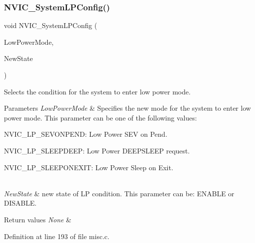 \mbox{\label{group___m_i_s_c_gae21011c5232f5b8f366acbecd12a1d4a}} 
\subsubsection{\texorpdfstring{N\+V\+I\+C\+\_\+\+System\+L\+P\+Config()}{NVIC\_SystemLPConfig()}}
{\footnotesize\ttfamily void N\+V\+I\+C\+\_\+\+System\+L\+P\+Config (\begin{DoxyParamCaption}\item[{uint8\+\_\+t}]{Low\+Power\+Mode,  }\item[{Functional\+State}]{New\+State }\end{DoxyParamCaption})}



Selects the condition for the system to enter low power mode. 


\begin{DoxyParams}{Parameters}
{\em Low\+Power\+Mode} & Specifies the new mode for the system to enter low power mode. This parameter can be one of the following values\+: \begin{DoxyItemize}
\item N\+V\+I\+C\+\_\+\+L\+P\+\_\+\+S\+E\+V\+O\+N\+P\+E\+ND\+: Low Power S\+EV on Pend. \item N\+V\+I\+C\+\_\+\+L\+P\+\_\+\+S\+L\+E\+E\+P\+D\+E\+EP\+: Low Power D\+E\+E\+P\+S\+L\+E\+EP request. \item N\+V\+I\+C\+\_\+\+L\+P\+\_\+\+S\+L\+E\+E\+P\+O\+N\+E\+X\+IT\+: Low Power Sleep on Exit. \end{DoxyItemize}
\\
\hline
{\em New\+State} & new state of LP condition. This parameter can be\+: E\+N\+A\+B\+LE or D\+I\+S\+A\+B\+LE. \\
\hline
\end{DoxyParams}

\begin{DoxyRetVals}{Return values}
{\em None} & \\
\hline
\end{DoxyRetVals}


Definition at line 193 of file misc.\+c.

\mbox{\label{group___m_i_s_c_ga2777d255bb06ad62bb6372a9db1ff385}} 
